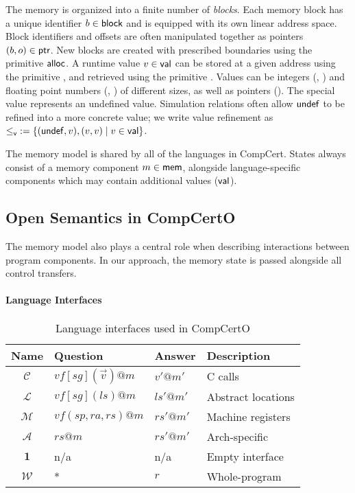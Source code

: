 \documentclass[sigplan,screen]{acmart}
\newcommand{\figsize}{\small}
\begin{document}
The memory is organized into a finite number of \emph{blocks}.
Each memory block has a unique identifier $b \in  \mathsf{block} $
and is equipped with its own linear address space.
Block identifiers and offsets are often manipulated together
as pointers $(b, o) \in  \mathsf{ptr} $.
New blocks are created with prescribed boundaries
using the primitive $ \mathsf{alloc} $.
A runtime value $v \in  \mathsf{val} $ can be stored at
a given address using the primitive ,
and retrieved using the primitive .
Values can be integers (, ) and
floating point numbers (, )
of different sizes,
as well as pointers ().
The special value 
represents an undefined value.
Simulation relations
often allow $ \mathsf{undef} $
to be refined into a more concrete value;
we write value refinement as
${\le_{ \mathsf{v} }} := \{( \mathsf{undef} , v), (v, v) \mid v \in  \mathsf{val} \}$.

The memory model is shared by all of the languages in CompCert.
States always consist of
a memory component $m \in  \mathsf{mem} $,
alongside language-specific components
which may contain additional values ($ \mathsf{val} $).



\subsection{Open Semantics in CompCertO} \label{sec:sem:open} %

The memory model also plays a central role
when describing interactions between program components.
In our approach, %
the memory state is passed %
alongside all control transfers.

\paragraph{Language Interfaces} %

\begin{table} %
  \caption{Language interfaces used in CompCertO}
  \label{tbl:li}
  \figsize
  \begin{tabular}{clll}
    \toprule
    Name & Question & Answer & Description \\
    \midrule
    $\mathcal{C}$ &
      $\mathit{vf}[\mathit{sg}](\vec{v})@m$ & $v'@m'$ &
      C calls \\
    $\mathcal{L}$ &
      $\mathit{vf}[\mathit{sg}](\mathit{ls})@m$ & $\mathit{ls}'@m'$ &
      Abstract locations \\
    $\mathcal{M}$ &
      $\mathit{vf}(\mathit{sp},\mathit{ra},\mathit{rs})@m$ & $\mathit{rs}'@m'$ &
      Machine registers \\
    $\mathcal{A}$ &
      $\mathit{rs}@m$ & $\mathit{rs}'@m'$ &
      Arch-specific \\
    $\mathbf{1}$ & n/a & n/a &
      Empty interface \\
    $\mathcal{W}$ & * & $r$ &
      Whole-program \\
    \bottomrule
  \end{tabular}
\end{table}
\end{document}
